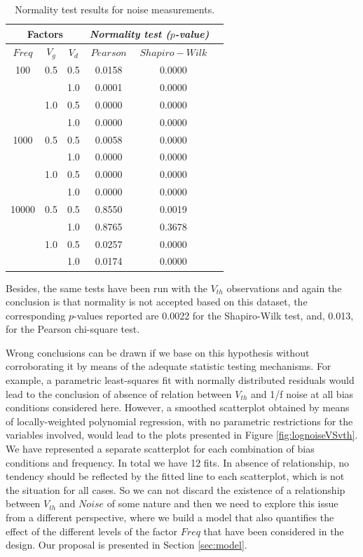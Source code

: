 \documentclass[sn-mathphys]{sn-jnl}%
\theoremstyle{thmstyleone}%
\theoremstyle{thmstyletwo}%
\theoremstyle{thmstylethree}%
\begin{document}
\begin{table}[!t]
	\centering
	\begin{tabular}{|c|c|c|c|c|c|}
		\hline
		\multicolumn{3}{|c|}{Factors}&\multicolumn{2}{c|}{{\it Normality test ($p$-value)}} \\ \hline
		$Freq$ & $V_g$ & $V_d$ & $Pearson$ & $Shapiro-Wilk$ \\ 
		\hline
		100   & 0.5 & 0.5 & 0.0158 & 0.0000 \\ 
		&     & 1.0 & 0.0001 & 0.0000 \\ 
		& 1.0 & 0.5 & 0.0000 & 0.0000 \\ 
		&     & 1.0 & 0.0000 & 0.0000 \\ 
		1000  & 0.5 & 0.5 & 0.0058 & 0.0000 \\ 
		&     & 1.0 & 0.0000 & 0.0000 \\ 
		& 1.0 & 0.5 & 0.0000 & 0.0000 \\ 
		&     & 1.0 & 0.0000 & 0.0000 \\ 
		10000 & 0.5 & 0.5 & 0.8550 & 0.0019 \\ 
		&     & 1.0 & 0.8765 & 0.3678 \\ 
		& 1.0 & 0.5 & 0.0257 & 0.0000\\ 
		&     & 1.0 & 0.0174 & 0.0000\\ 
		\hline
	\end{tabular}
	\caption{Normality test results for noise measurements.} 
	\label{tab:normality}
\end{table}

Besides, the same tests have been run with the $V_{th}$ observations and again the conclusion is that normality is not accepted based on this dataset, the corresponding $p$-values reported are  0.0022 for the Shapiro-Wilk test, and, 0.013, for the Pearson chi-square test.

Wrong conclusions can be drawn if we base on this hypothesis without corroborating it by means of the adequate statistic testing mechanisms.
For example, a parametric least-squares fit with normally distributed residuals would lead to the conclusion of absence of relation between $V_{th}$ and 1/f noise at all bias conditions considered here. However, a smoothed scatterplot obtained by means of locally-weighted polynomial regression, with no parametric restrictions for the variables involved, would lead to the plots presented in Figure \ref{fig:lognoiseVSvth}. We have represented a separate scatterplot for each combination of bias conditions and frequency. In total we have 12 fits. In absence of relationship, no tendency should be reflected by the fitted line to each scatterplot, which is not the situation for all cases. So we can not discard the existence of a relationship between $V_{th}$ and $Noise$ of some nature and then we need to explore this issue from a different perspective, where we build a model that also quantifies the effect of the different levels of the factor $Freq$ that have been considered in the design. Our proposal is presented in Section \ref{sec:model}.
\end{document}

